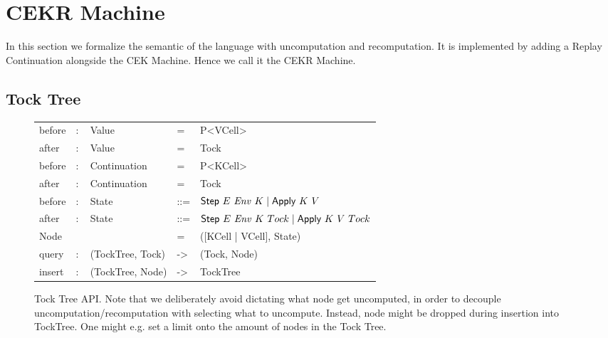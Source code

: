 \section{CEKR Machine}
In this section we formalize the semantic of the language with uncomputation and recomputation. It is implemented by adding a Replay Continuation alongside the CEK Machine.
Hence we call it the CEKR Machine.

\subsection{Tock Tree}
\begin{figure}
	\begin{tabular}{p{6em} p{2.6em} p{7em} p{1em} p{}}
	before & $:$ & Value & = & P<VCell> \\
	after & $:$ & Value & = & Tock \\
	before & $:$ & Continuation & = & P<KCell> \\
	after & $:$ & Continuation & = & Tock \\
	before & $:$ & State & ::= & $\textsf{Step}~E~\mathit{Env}~K \mid \textsf{Apply}~K~V $ \\
	after & $:$ & State & ::= & $\textsf{Step}~E~\mathit{Env}~K~Tock \mid \textsf{Apply}~K~V~Tock $ \\
	Node & & & = & ([KCell | VCell], State) \\
	query & $:$ & (TockTree, Tock) & -> & (Tock, Node) \\
	insert & $:$ & (TockTree, Node) & -> & TockTree \\
	\end{tabular}
	\caption{Tock Tree API. Note that we deliberately avoid dictating what node get uncomputed, in order to decouple uncomputation/recomputation with selecting what to uncompute. Instead, node might be dropped during insertion into TockTree. One might e.g. set a limit onto the amount of nodes in the Tock Tree. }
\end{figure}

